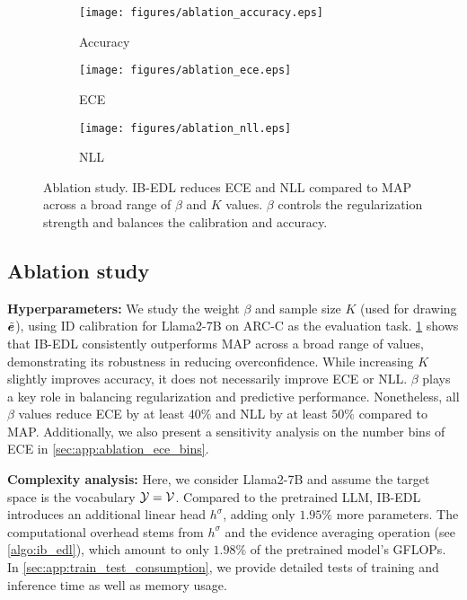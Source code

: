 
\begin{figure}[t]
    \begin{subfigure}{0.3\textwidth}
        \centering
        \texttt{[image: figures/ablation\_accuracy.eps]}
        \caption{Accuracy}
    \end{subfigure}
    \hfill
    \begin{subfigure}{0.3\textwidth}
        \centering
        \texttt{[image: figures/ablation\_ece.eps]}
        \caption{ECE}
    \end{subfigure}
    \hfill
    \begin{subfigure}{0.3\textwidth}
        \centering
        \texttt{[image: figures/ablation\_nll.eps]}
        \caption{NLL}
    \end{subfigure}
    \caption{Ablation study. IB-EDL reduces ECE and NLL compared to MAP across a broad range of $\beta$ and $K$ values. $\beta$ controls the regularization strength and balances the calibration and accuracy.}
    \label{fig:ablation_study}
\end{figure}

\subsection{Ablation study} \label{sec:ablation_study}
\textbf{Hyperparameters:} We study the weight $\beta$ and sample size $K$ (used for drawing $\tilde{\bm{e}}$), using ID calibration for Llama2-7B on ARC-C as the evaluation task. \cref{fig:ablation_study} shows that IB-EDL consistently outperforms MAP across a broad range of values, demonstrating its robustness in reducing overconfidence. While increasing $K$ slightly improves accuracy, it does not necessarily improve ECE or NLL. $\beta$ plays a key role in balancing regularization and predictive performance.
Nonetheless, all $\beta$ values reduce ECE by at least $40\%$ and NLL by at least $50\%$ compared to MAP. Additionally, we also present a sensitivity analysis on the number bins of ECE in \cref{sec:app:ablation_ece_bins}.

\textbf{Complexity analysis:} Here, we consider Llama2-7B and assume the target space is the vocabulary $\mathcal{Y} = \mathcal{V}$. Compared to the pretrained LLM, IB-EDL introduces an additional linear head $h^\sigma$, adding only $1.95\%$ more parameters. The computational overhead stems from $h^\sigma$ and the evidence averaging operation (see \cref{algo:ib_edl}), which amount to only $1.98\%$ of the pretrained model's GFLOPs. In \cref{sec:app:train_test_consumption}, we provide detailed tests of training and inference time as well as memory usage.